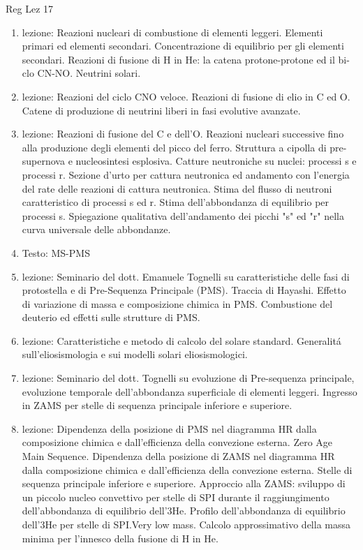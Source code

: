 \begin{frame}[allowframebreaks]{Reg Lez 17}
\begin{enumerate}
\item lezione: Reazioni nucleari di combustione di elementi leggeri. Elementi primari ed elementi secondari. Concentrazione di equilibrio per gli elementi secondari. Reazioni di fusione di H in He: la catena protone-protone ed il bi-clo CN-NO. Neutrini solari.
\item lezione: Reazioni del ciclo CNO veloce. Reazioni di fusione di elio in C ed O. Catene di produzione di neutrini liberi in fasi evolutive avanzate.
\item lezione: Reazioni di fusione del C e dell'O. Reazioni nucleari successive fino alla produzione degli elementi del picco del ferro. Struttura a cipolla di pre-supernova e nucleosintesi esplosiva. Catture neutroniche su nuclei: processi s e processi r. Sezione d'urto per cattura neutronica ed andamento con l'energia del rate delle reazioni di cattura neutronica. Stima del flusso di neutroni caratteristico di processi s ed r. Stima dell'abbondanza di equilibrio per processi s. Spiegazione qualitativa dell'andamento dei picchi "s" ed "r" nella curva universale delle abbondanze.
\item Testo: MS-PMS
\item lezione: Seminario del dott. Emanuele Tognelli su caratteristiche delle fasi di protostella e di Pre-Sequenza Principale (PMS). Traccia di Hayashi. Effetto di variazione di massa e composizione chimica in PMS. Combustione del deuterio ed effetti sulle strutture di PMS.
\item lezione: Caratteristiche e metodo di calcolo del solare standard. Generalit\'a sull'eliosismologia e sui modelli solari eliosismologici.
\item lezione: Seminario del dott. Tognelli su evoluzione di Pre-sequenza principale, evoluzione temporale dell'abbondanza superficiale di elementi leggeri. Ingresso in ZAMS per stelle di sequenza principale inferiore e superiore.
\item lezione: Dipendenza della posizione di PMS nel diagramma HR dalla composizione chimica e dall'efficienza della convezione esterna. Zero Age Main Sequence. Dipendenza della posizione di ZAMS nel diagramma HR dalla composizione chimica e dall'efficienza della convezione esterna. Stelle di sequenza principale inferiore e superiore. Approccio alla ZAMS: sviluppo di un piccolo nucleo convettivo per stelle di SPI durante il raggiungimento dell'abbondanza di equilibrio dell'3He. Profilo dell'abbondanza di equilibrio dell'3He per stelle di SPI.Very low mass. Calcolo approssimativo della massa minima per l'innesco della fusione di H in He. 

\end{enumerate}
\end{frame}
